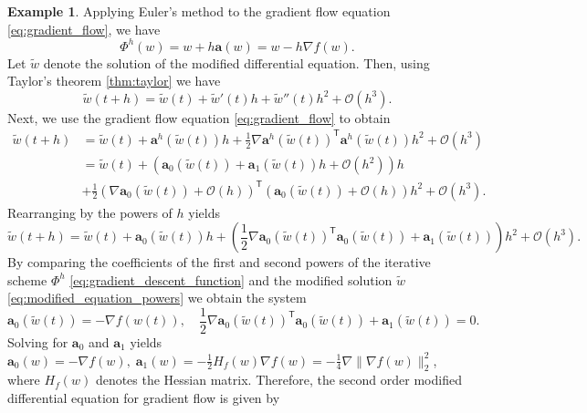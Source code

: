 \documentclass[12pt]{article}
\theoremstyle{definition}
\newtheorem{example}[example]{Example}
\numberwithin{equation}{section}
\newcommand{\CO}{\mathcal{O}}
\newcommand{\T}{\mathsf{T}}
\newcommand{\norm}[1]{\lVert{#1}\rVert_2}
\begin{document}
\begin{example}
Applying Euler's method to the gradient flow equation \eqref{eq:gradient_flow}, we have 
\begin{equation}
  \label{eq:gradient_descent_function}
  \Phi^h(w) = w + h \mathbf{a}(w) = w - h \nabla f(w).
\end{equation}
 Let $\widetilde{w}$ denote the solution of the modified differential equation. Then, using Taylor's theorem \autoref{thm:taylor} we have
  \begin{equation*}
    \widetilde{w}(t+h) = \widetilde{w}(t) + \widetilde{w}'(t)h + \widetilde{w}''(t)h^2 + \CO(h^3).
  \end{equation*}
  Next, we use the gradient flow equation \eqref{eq:gradient_flow} to obtain
\begin{align*}
  \widetilde{w}(t+h) &= \widetilde{w}(t) + \mathbf{a}^h(\widetilde{w}(t))h + \frac{1}{2}\nabla \mathbf{a}^h(\widetilde{w}(t))^\T\mathbf{a}^h(\widetilde{w}(t)) h^2 + \CO(h^3) \\
  &= \widetilde{w}(t) + (\mathbf{a}_0(\widetilde{w}(t)) + \mathbf{a}_1(\widetilde{w}(t))h + \CO(h^2))h \\
  &+ \frac{1}{2}(\nabla \mathbf{a}_0(\widetilde{w}(t)) + \CO(h))^\T(\mathbf{a}_0(\widetilde{w}(t)) + \CO(h))h^2 + \CO(h^3).
\end{align*}
Rearranging by the powers of $h$ yields
\begin{equation}
  \label{eq:modified_equation_powers}
  \widetilde{w}(t+h) = \widetilde{w}(t) + \mathbf{a}_0(\widetilde{w}(t))h + \left( \frac{1}{2}\nabla \mathbf{a}_0(\widetilde{w}(t))^\T \mathbf{a}_0(\widetilde{w}(t)) + \mathbf{a}_1(\widetilde{w}(t))\right)h^2 + \CO(h^3). 
\end{equation}
By comparing the coefficients of the first and second powers of the iterative scheme $\Phi^h$ \eqref{eq:gradient_descent_function} and the modified solution $\widetilde{w}$ \eqref{eq:modified_equation_powers} we obtain the system
\begin{equation*}
    \mathbf{a}_0(\widetilde{w}(t)) = - \nabla f(w(t)), \quad
    \frac{1}{2}\nabla \mathbf{a}_0(\widetilde{w}(t))^\T \mathbf{a}_0(\widetilde{w}(t)) + \mathbf{a}_1(\widetilde{w}(t)) = 0.
\end{equation*}
Solving for $\mathbf{a}_0$ and $\mathbf{a}_1$ yields $\mathbf{a}_0(w) = -\nabla f(w), \; \mathbf{a}_1(w) = - \frac{1}{2} H_f(w)\nabla f(w) = -\frac{1}{4}\nabla\norm{\nabla f(w)}^2$, where $H_f(w)$ denotes the Hessian matrix. Therefore, the second order modified differential equation for gradient flow is given by

\end{example}
\end{document}
